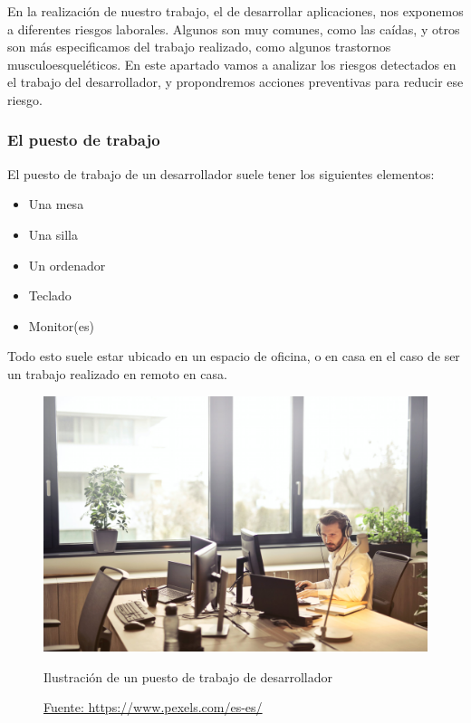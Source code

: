 
En la realización de nuestro trabajo, el de desarrollar aplicaciones, nos exponemos a
diferentes riesgos laborales. Algunos son muy comunes, como las caídas, y otros son más especificamos
del trabajo realizado, como algunos trastornos musculoesqueléticos. En este apartado vamos a analizar
los riesgos detectados en el trabajo del desarrollador, y propondremos acciones preventivas para
reducir ese riesgo.\\

\subsubsection{El puesto de trabajo}
El puesto de trabajo de un desarrollador suele tener los siguientes elementos:
\begin{itemize}
    \item Una mesa
    \item Una silla
    \item Un ordenador
    \item Teclado
    \item Monitor(es)
\end{itemize}
Todo esto suele estar ubicado en un espacio de oficina, o en casa en el caso de ser un
trabajo realizado en remoto en casa.

\begin{figure}[H]
    \centering
    \includegraphics[width=1.0\textwidth]{Fol/oficina.jpeg}
    \caption{Ilustración de un puesto de trabajo de desarrollador}
    \caption*{\href{https://www.pexels.com/es-es/foto/hombre-con-auriculares-frente-al-monitor-de-la-computadora-845451/}{Fuente: https://www.pexels.com/es-es/}}
\end{figure}


